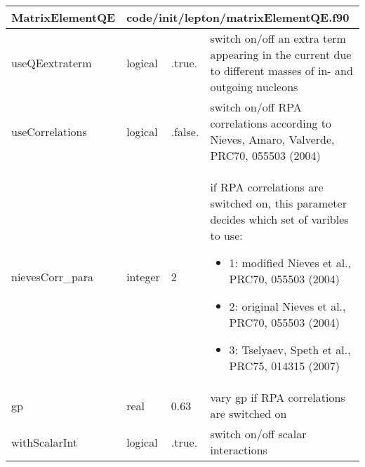 \documentclass{article}
\begin{document}
\begin{longtable}{llll}
\toprule
\textbf{\large{MatrixElementQE}} & \multicolumn{3}{l}{\footnotesize{code/init/lepton/matrixElementQE.f90}}\\*
\midrule
\endfirsthead
\midrule
\endhead
useQEextraterm & \begin{minipage}[t]{2cm}logical\end{minipage} & \begin{minipage}[t]{2cm}.true.\end{minipage} & \begin{minipage}[t]{12cm}switch on/off an extra term appearing in the current due to different masses of in- and outgoing nucleons\end{minipage}\\*
\midrule
useCorrelations & \begin{minipage}[t]{2cm}logical\end{minipage} & \begin{minipage}[t]{2cm}.false.\end{minipage} & \begin{minipage}[t]{12cm}switch on/off RPA correlations according to Nieves, Amaro, Valverde, PRC70, 055503 (2004)\end{minipage}\\*
\midrule
nievesCorr\_para & \begin{minipage}[t]{2cm}integer\end{minipage} & \begin{minipage}[t]{2cm}2\end{minipage} & \begin{minipage}[t]{12cm}if RPA correlations are switched on, this parameter decides which set of varibles to use:\begin{itemize}\leftmargin0em\itemindent0pt\item 1: modified Nieves et al., PRC70, 055503 (2004)\item 2: original Nieves et al., PRC70, 055503 (2004)\item 3: Tselyaev, Speth et al., PRC75, 014315 (2007)\end{itemize}\end{minipage}\\*
\midrule
gp & \begin{minipage}[t]{2cm}real\end{minipage} & \begin{minipage}[t]{2cm}0.63\end{minipage} & \begin{minipage}[t]{12cm}vary gp if RPA correlations are switched on\end{minipage}\\*
\midrule
withScalarInt & \begin{minipage}[t]{2cm}logical\end{minipage} & \begin{minipage}[t]{2cm}.true.\end{minipage} & \begin{minipage}[t]{12cm}switch on/off scalar interactions\end{minipage}\\*
\bottomrule
\end{longtable}
{ }
\end{document}
